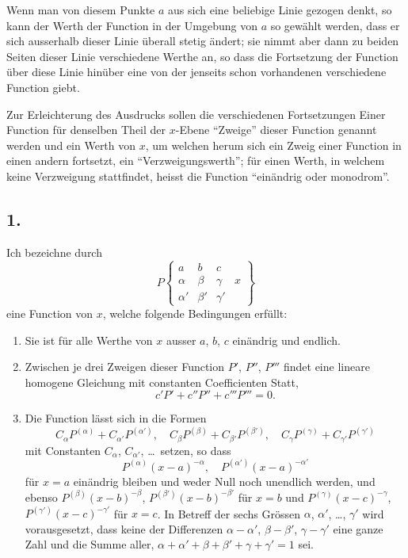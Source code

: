 \documentclass[12pt,a4paper]{book}
\theoremstyle{definition}
\theoremstyle{remark}
\begin{document}
Wenn man von diesem Punkte $a$ aus sich eine beliebige Linie gezogen denkt, so kann der Werth der Function in der Umgebung von $a$ so gewählt werden, dass er sich ausserhalb dieser Linie überall stetig ändert; sie nimmt aber dann zu beiden Seiten dieser Linie verschiedene Werthe an, so dass die Fortsetzung der Function über diese Linie hinüber eine von der jenseits schon vorhandenen verschiedene Function giebt.

Zur Erleichterung des Ausdrucks sollen die verschiedenen Fortsetzungen Einer Function für denselben Theil der $x$-Ebene ``Zweige'' dieser Function genannt werden und ein Werth von $x$, um welchen herum sich ein Zweig einer Function in einen andern fortsetzt, ein ``Verzweigungswerth''; für einen Werth, in welchem keine Verzweigung stattfindet, heisst die Function ``einändrig oder monodrom''.

\subsection*{1.}

Ich bezeichne durch
\[
P\left\{\begin{array}{ccc|c}
a & b & c & \\
\alpha & \beta & \gamma & x \\
\alpha' & \beta' & \gamma' &
\end{array}\right\}
\]
eine Function von $x$, welche folgende Bedingungen erfüllt:
\begin{enumerate}
\item Sie ist für alle Werthe von $x$ ausser $a$, $b$, $c$ einändrig und endlich.
\item Zwischen je drei Zweigen dieser Function $P'$, $P''$, $P'''$ findet eine lineare homogene Gleichung mit constanten Coefficienten Statt,
\[
c'P' + c''P'' + c'''P''' = 0.
\]
\item Die Function lässt sich in die Formen
\[
C_{\alpha} P^{(\alpha)} + C_{\alpha'} P^{(\alpha')}, \quad
C_{\beta} P^{(\beta)} + C_{\beta'} P^{(\beta')}, \quad
C_{\gamma} P^{(\gamma)} + C_{\gamma'} P^{(\gamma')}
\]
mit Constanten $C_{\alpha}$, $C_{\alpha'}$, \dots\ setzen, so dass
\[
P^{(\alpha)}(x-a)^{-\alpha}, \quad P^{(\alpha')}(x-a)^{-\alpha'}
\]
für $x = a$ einändrig bleiben und weder Null noch unendlich werden, und ebenso $P^{(\beta)}(x-b)^{-\beta}$, $P^{(\beta')}(x-b)^{-\beta'}$ für $x = b$ und $P^{(\gamma)}(x-c)^{-\gamma}$, $P^{(\gamma')}(x-c)^{-\gamma'}$ für $x = c$. In Betreff der sechs Grössen $\alpha$, $\alpha'$, \dots, $\gamma'$ wird vorausgesetzt, dass keine der Differenzen $\alpha - \alpha'$, $\beta - \beta'$, $\gamma - \gamma'$ eine ganze Zahl und die Summe aller, $\alpha + \alpha' + \beta + \beta' + \gamma + \gamma' = 1$ sei.
\end{enumerate}
\end{document}
